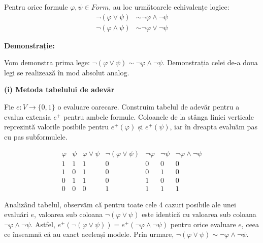 \begin{prop}
	Pentru orice formule $\varphi, \psi \in Form$, au loc următoarele echivalențe logice:
	\begin{align}
		\neg(\varphi \lor \psi)  & \sim \neg\varphi \land \neg\psi \tag{10} \\
		\neg(\varphi \land \psi) & \sim \neg\varphi \lor \neg\psi \tag{11}
	\end{align}
\end{prop}

\textbf{Demonstrație:}

Vom demonstra prima lege: $\neg(\varphi \lor \psi) \sim \neg\varphi \land \neg\psi$. Demonstrația celei de-a doua legi se realizează în mod absolut analog.

\vspace{0.3cm}
\noindent \textbf{(i) Metoda tabelului de adevăr}

Fie $e : V \to \{0,1\}$ o evaluare oarecare. Construim tabelul de adevăr pentru a evalua extensia $e^+$ pentru ambele formule. Coloanele de la stânga liniei verticale reprezintă valorile posibile pentru $e^+(\varphi)$ și $e^+(\psi)$, iar în dreapta evaluăm pas cu pas subformulele.

\[
	\begin{array}{cc|c|c|cc|c}
		\varphi & \psi & \varphi \lor \psi & \neg(\varphi \lor \psi) & \neg\varphi & \neg\psi & \neg\varphi \land \neg\psi \\
		\hline
		1       & 1    & 1                 & 0                       & 0           & 0        & 0                          \\
		1       & 0    & 1                 & 0                       & 0           & 1        & 0                          \\
		0       & 1    & 1                 & 0                       & 1           & 0        & 0                          \\
		0       & 0    & 0                 & 1                       & 1           & 1        & 1
	\end{array}
\]

Analizând tabelul, observăm că pentru toate cele 4 cazuri posibile ale unei evaluări $e$, valoarea sub coloana $\neg(\varphi \lor \psi)$ este identică cu valoarea sub coloana $\neg\varphi \land \neg\psi$. Astfel, $e^+(\neg(\varphi \lor \psi)) = e^+(\neg\varphi \land \neg\psi)$ pentru orice evaluare $e$, ceea ce înseamnă că au exact aceleași modele. Prin urmare, $\neg(\varphi \lor \psi) \sim \neg\varphi \land \neg\psi$.

